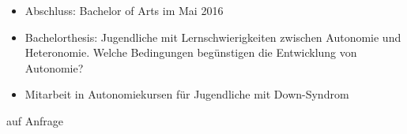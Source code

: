 



  \begin{itemize}
    \item {Abschluss: Bachelor of Arts im Mai 2016}
    \item {Bachelorthesis: Jugendliche mit Lernschwierigkeiten zwischen Autonomie und Heteronomie. Welche Bedingungen begünstigen die Entwicklung von Autonomie?}
  \end{itemize}
  \divider

  \begin{itemize}
    \item {Mitarbeit in Autonomiekursen für Jugendliche mit Down-Syndrom}
  \end{itemize}
  \divider


  auf Anfrage 

